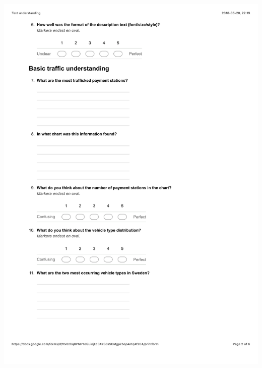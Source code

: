 \documentclass[12pt]{kththesis}
\begin{document}
\begin{appendices}
\includegraphics[width=1\textwidth]{TextUnderstanding2.pdf}

\end{appendices}
\end{document}

